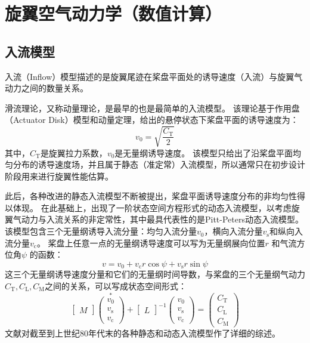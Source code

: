 \section{旋翼空气动力学（数值计算）}

\subsection{入流模型}
入流（Inflow）模型描述的是旋翼尾迹在桨盘平面处的诱导速度（入流）与旋翼气动力之间的数量关系。

滑流理论，又称动量理论，是最早的也是最简单的入流模型。
该理论基于作用盘（Actuator Disk）模型和动量定理，给出的悬停状态下桨盘平面的诱导速度为：
\begin{equation}
  v_{ \mathrm{0} }  = \sqrt{\frac{C_\mathrm{T}}{2}}
\end{equation}
其中，$C_\mathrm{T}$是旋翼拉力系数，$v_{ \mathrm{0} }$是无量纲诱导速度。
该模型只给出了沿桨盘平面均匀分布的诱导速度场，并且属于静态（准定常）入流模型，所以通常只在初步设计阶段用来进行旋翼性能估算。

此后，各种改进的静态入流模型不断被提出，桨盘平面诱导速度分布的非均匀性得以体现。
在此基础上，出现了一阶状态空间方程形式的动态入流模型，以考虑旋翼气动力与入流关系的非定常性，其中最具代表性的是Pitt-Peters动态入流模型。
该模型包含三个无量纲诱导入流分量：均匀入流分量$v_{\mathrm{0}}$，横向入流分量$v_{\mathrm{s}}$和纵向入流分量$v_{\mathrm{c}}$。
桨盘上任意一点的无量纲诱导速度可以写为无量纲展向位置$r$ 和气流方位角$\psi$ 的函数：
\begin{equation}
v = v_0 + v_{\mathrm{c}} r \cos \psi + v_{\mathrm{s}} r \sin \psi
\end{equation}
这三个无量纲诱导速度分量和它们的无量纲时间导数，与桨盘的三个无量纲气动力$C_{ \mathrm{T} },C_{ \mathrm{L} },C_{ \mathrm{M} }$之间的关系，可以写成状态空间形式：
\begin{equation}
\begin{bmatrix} M \end{bmatrix}
\overset { * }{ \begin{pmatrix} v_{ \mathrm{0} } \\ v_{ \mathrm{s} } \\ v_{ \mathrm{c} } \end{pmatrix} }
+
\begin{bmatrix} L  \end{bmatrix}^ { -1}
\begin{pmatrix} v_{ \mathrm{0} } \\ v_{ \mathrm{s} } \\ v_{ \mathrm{c} } \end{pmatrix}
=
\begin{pmatrix} C_{ \mathrm{T} } \\ C_{ \mathrm{L} } \\ C_{ \mathrm{M} } \end{pmatrix}
\end{equation}
文献\cite{Chen1989}对截至到上世纪80年代末的各种静态和动态入流模型作了详细的综述。

